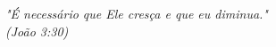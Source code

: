 \begin{epigrafe}
    \vspace*{\fill}
	\begin{flushright}
		\textit{"É necessário que Ele cresça e que eu diminua."\\
		(João 3:30)}
	\end{flushright}
\end{epigrafe}
